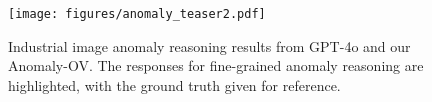 \begin{figure}[t]
\centering
    \texttt{[image: figures/anomaly\_teaser2.pdf]}
\caption{Industrial image anomaly reasoning results from GPT-4o \cite{gpt-api-4o} and our Anomaly-OV. The responses for fine-grained anomaly reasoning are highlighted, with the ground truth given for reference.}
\label{fig:teaser2}
 \vspace{-2mm}
\end{figure}
